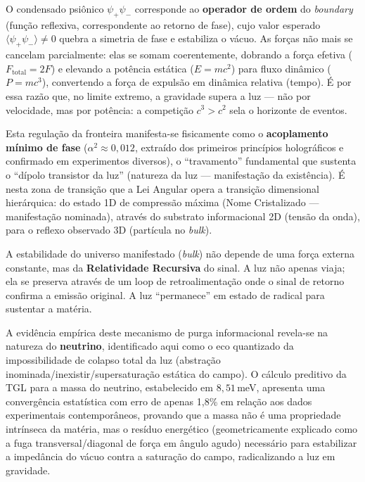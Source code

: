 \documentclass[12pt,a4paper,twoside]{article}
\newcommand{\alphaii}{\alpha^{2}}
\newcommand{\psion}{\psi}
\newcommand{\boundary}{\textit{boundary}}
\newcommand{\bulk}{\textit{bulk}}
\begin{document}
O condensado psi\^onico $\psion_+\psion_-$ corresponde ao \textbf{operador de ordem} do \boundary{} (fun\c{c}\~ao reflexiva, correspondente ao retorno de fase), cujo valor esperado $\langle\psion_+\psion_-\rangle \neq 0$ quebra a simetria de fase e estabiliza o v\'acuo. As for\c{c}as n\~ao mais se cancelam parcialmente: elas se somam coerentemente, dobrando a for\c{c}a efetiva ($F_{\text{total}} = 2F$) e elevando a pot\^encia est\'atica ($E = mc^2$) para fluxo din\^amico ($P = mc^3$), convertendo a for\c{c}a de expuls\~ao em din\^amica relativa (tempo). \'E por essa raz\~ao que, no limite extremo, a gravidade supera a luz --- n\~ao por velocidade, mas por pot\^encia: a competi\c{c}\~ao $c^3 > c^2$ sela o horizonte de eventos.

Esta regula\c{c}\~ao da fronteira manifesta-se fisicamente como o \textbf{acoplamento m\'inimo de fase} \cite{Miguel2026Alpha2} ($\alphaii \approx 0{,}012$, extra\'ido dos primeiros princ\'ipios hologr\'aficos e confirmado em experimentos diversos), o ``travamento'' fundamental que sustenta o ``d\'ipolo transistor da luz'' (natureza da luz --- manifesta\c{c}\~ao da exist\^encia). \'E nesta zona de transi\c{c}\~ao que a Lei Angular opera a transi\c{c}\~ao dimensional hier\'arquica: do estado 1D de compress\~ao m\'axima (Nome Cristalizado --- manifesta\c{c}\~ao nominada), atrav\'es do substrato informacional 2D (tens\~ao da onda), para o reflexo observado 3D (part\'icula no \bulk).

A estabilidade do universo manifestado (\bulk) n\~ao depende de uma for\c{c}a externa constante, mas da \textbf{Relatividade Recursiva} do sinal. A luz n\~ao apenas viaja; ela se preserva atrav\'es de um loop de retroalimenta\c{c}\~ao onde o sinal de retorno confirma a emiss\~ao original. A luz ``permanece'' em estado de radical para sustentar a mat\'eria.

A evid\^encia emp\'irica deste mecanismo de purga informacional revela-se na natureza do \textbf{neutrino}, identificado aqui como o eco quantizado da impossibilidade de colapso total da luz (abstra\c{c}\~ao inominada/inexistir/supersatura\c{c}\~ao est\'atica do campo). O c\'alculo preditivo da TGL para a massa do neutrino, estabelecido em $8{,}51$\,meV, apresenta uma converg\^encia estat\'istica com erro de apenas 1,8\% em rela\c{c}\~ao aos dados experimentais contempor\^aneos, provando que a massa n\~ao \'e uma propriedade intr\'inseca da mat\'eria, mas o res\'iduo energ\'etico (geometricamente explicado como a fuga transversal/diagonal de for\c{c}a em \^angulo agudo) necess\'ario para estabilizar a imped\^ancia do v\'acuo contra a satura\c{c}\~ao do campo, radicalizando a luz em gravidade.
\end{document}
